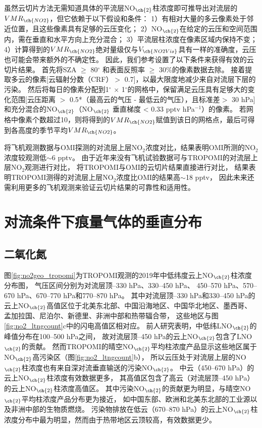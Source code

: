 虽然云切片方法无需知道具体的平流层NO$_{\ch{2}}$柱浓度即可推导出对流层的$VMR_{\ch{NO2}}$，但它依赖于以下假设和条件：
1）有相对大量的多云像素处于邻近位置，且这些像素具有足够的云压变化；
2）NO$_{\ch{2}}$在给定的云压和空间范围内，需在垂直和水平方向上充分混合；
3）平流层柱浓度在像素区域内保持不变；
4）计算得到的$VMR_{\ch{NO2}}$绝对量级仅与$V_{\ch{NO2Vis}}$具有一样的准确度，云压也可能会带来额外的不确定性。
因此，我们参考\citet{Marais.2021}设置了以下条件来获得有效的云切片结果。
首先将SZA $\geq$ 80$^{\circ}$ 和表面反照率 $\geq$  30\%的像素数据去除。
接着提取多云的像素[云辐射分数（CRF）$>$ 0.7]，以最大限度地减少来自对流层下层的污染。
然后将每日的像素分配到1$^{\circ}$ $\times$ 1$^{\circ}$的网格中，保留满足云压具有足够大的变化范围[云压距离 $>$ 0.5*（最高云的气压 - 最低云的气压），且标准差$>$ 30 hPa]和充分混合的NO$_{\ch{2}}$（NO$_{\ch{2}}$ 垂直梯度 < 0.33 pptv hPa$^{-1}$）的像素。
若网格中像素个数超过10，则将得到的$VMR_{\ch{NO2}}$赋值到该日的网格点，最后可得到各高度的季节平均$VMR_{\ch{NO2}}$。

\citet{Marais.2018}将飞机观测数据与OMI探测的对流层上层NO$_2$浓度对比，结果表明OMI所测的NO$_2$浓度较观测低$\sim$6 pptv。
由于近年来没有飞机试验数据可与TROPOMI的对流层上层NO$_2$观测进行对比，
\citet{Marais.2021}将TROPOMI与OMI的云切片结果直接进行对比，
结果表明TROPOMI测得的对流层上层NO$_2$浓度比OMI的结果高$\sim$18 pptv，
因此未来还需利用更多的飞机观测来验证云切片结果的可靠性和适用性。


\section{对流条件下痕量气体的垂直分布} \label{sec:cld_profile}

\subsection{二氧化氮}


图\ref{fig:no2geo_tropomi}为TROPOMI观测的2019年中低纬度云上NO$_{\ch{2}}$柱浓度分布图，
气压区间分别为对流层顶--330 hPa、330--450 hPa、
450--570 hPa、570--670 hPa、670--770 hPa和770--870 hPa。
其中对流层顶--330 hPa和330--450 hPa的云上NO$_{\ch{2}}$高值区位于北美东北部、中国沿海地区、中国华北地区、墨西哥、
孟加拉国、尼泊尔、新德里、非洲中部和热带辐合带，
这些地区与图\ref{fig:no2_ltngcount}c中的闪电高值区相对应。
前人研究表明，中低纬LNO$_{\ch{2}}$的峰值分布在100--500 hPa之间\citep{Pickering.1988,Ott.2010,Luo.2017}，
故对流层顶--450 hPa的云上NO$_{\ch{2}}$包含了LNO$_{\ch{2}}$的贡献。
然而TROPOMI的晴空NO$_{\ch{2}}$平均柱浓度产品显示这些地区属于NO$_{\ch{2}}$高污染区（图\ref{fig:no2_ltngcount}b），
所以云压处于对流层上层的NO$_{\ch{2}}$柱浓度也有来自深对流垂直输送的污染NO$_{\ch{2}}$。
中云（450--670 hPa）的云上NO$_{\ch{2}}$柱浓度有效数据更多，
其高值区包含了高云（对流层顶--450 hPa）的云上NO$_{\ch{2}}$柱浓度高值区。
其中污染NO$_{\ch{2}}$的贡献更为明显，与晴空NO$_{\ch{2}}$平均柱浓度产品分布更为接近，
如中国东部、欧洲和北美东北部的工业源以及非洲中部的生物质燃烧。
污染物排放在低云（670--870 hPa）的云上NO$_{\ch{2}}$柱浓度分布中最为明显，然而由于热带地区云顶较高，有效数据更少。

